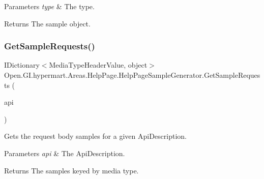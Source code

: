 \begin{DoxyParams}{Parameters}
{\em type} & The type.\\
\hline
\end{DoxyParams}
\begin{DoxyReturn}{Returns}
The sample object.
\end{DoxyReturn}
\hypertarget{class_open_1_1_g_i_1_1hypermart_1_1_areas_1_1_help_page_1_1_help_page_sample_generator_a1ae2a75ff1221fb53031799fbf2e4e65}{}\label{class_open_1_1_g_i_1_1hypermart_1_1_areas_1_1_help_page_1_1_help_page_sample_generator_a1ae2a75ff1221fb53031799fbf2e4e65} 
\subsubsection{\texorpdfstring{Get\+Sample\+Requests()}{GetSampleRequests()}}
{\footnotesize\ttfamily I\+Dictionary$<$Media\+Type\+Header\+Value, object$>$ Open.\+G\+I.\+hypermart.\+Areas.\+Help\+Page.\+Help\+Page\+Sample\+Generator.\+Get\+Sample\+Requests (\begin{DoxyParamCaption}\item[{Api\+Description}]{api }\end{DoxyParamCaption})}



Gets the request body samples for a given Api\+Description. 


\begin{DoxyParams}{Parameters}
{\em api} & The Api\+Description.\\
\hline
\end{DoxyParams}
\begin{DoxyReturn}{Returns}
The samples keyed by media type.
\end{DoxyReturn}
\hypertarget{class_open_1_1_g_i_1_1hypermart_1_1_areas_1_1_help_page_1_1_help_page_sample_generator_ac1b28b1a321875fe574c8db544326551}{}\label{class_open_1_1_g_i_1_1hypermart_1_1_areas_1_1_help_page_1_1_help_page_sample_generator_ac1b28b1a321875fe574c8db544326551} 
